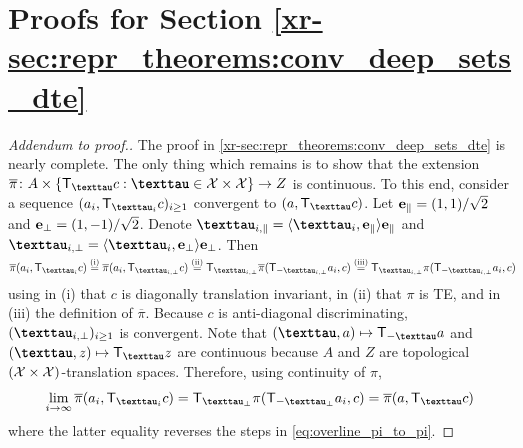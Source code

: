 \documentclass[12pt, twoside]{report}
\newcommand{\xrprefix}[1]{xr-#1}
\begin{document}
\section{Proofs for Section \ref{\xrprefix{sec:repr_theorems:conv_deep_sets_dte}}}
\label{sec:proofs_repr_theorems:conv_deep_sets_dte}

\begingroup
    \newcommand{\maybeprefix}[1]{\xrprefix{#1}}
\endgroup
\begin{proof}[Addendum to proof.]
    The proof in \cref{\xrprefix{sec:repr_theorems:conv_deep_sets_dte}} is nearly complete.
    The only thing which remains is to show that the extension
    $
        \overline{\pi} \colon A \times \set{\T_{\vtau} c : \vtau \in \X \times \X} \to Z
    $
    is continuous.
    To this end, consider a sequence $(a_i, \T_{\vtau_i} c)_{i \ge 1}$ convergent to $(a, \T_{\vtau} c)$.
    Let $\mathbf{e}_\parallel = (1, 1) / \sqrt{2}$ and $\mathbf{e}_\perp = (1, -1) / \sqrt{2}$.
    Denote $\vtau_{i,\parallel} = \lra{\vtau_i, \ve_{\parallel}} \ve_{\parallel}$
    and $\vtau_{i,\perp} = \lra{\vtau_i, \ve_{\perp}} \ve_{\perp}$.
    Then
    \begin{equation} \label{eq:overline_pi_to_pi}
        \overline{\pi}(a_i, \T_{\vtau_i} c)
        \overset{\smash{\text{(i)}}}{=} \overline{\pi}(a_i, \T_{\vtau_{i, \perp}} c)
        \overset{\smash{\text{(ii)}}}{=} \T_{\vtau_{i, \perp}} \overline{\pi}(\T_{-\vtau_{i,\perp}}a_i, c)
        \overset{\smash{\text{(iii)}}}{=} \T_{\vtau_{i, \perp}} \pi(\T_{-\vtau_{i,\perp}}a_i, c)
        \hspace{-5pt}
    \end{equation}
    using in (i) that $c$ is diagonally translation invariant, in (ii) that $\pi$ is TE, and in (iii) the definition of $\overline{\pi}$.
    Because $c$ is anti-diagonal discriminating, $(\vtau_{i,\perp})_{i \ge 1}$ is convergent.
    Note that $(\vtau, a) \mapsto \T_{-\vtau} a$
    and $(\vtau, z) \mapsto \T_{\vtau} z$ are continuous because $A$ and $Z$ are topological $(\mathcal{X}\times\mathcal{X})$-translation spaces.
    Therefore, using continuity of $\pi$,
    \begin{align}
        \lim_{i \to \infty} \overline{\pi}(a_i, \T_{\vtau_i} c)
        = \T_{\vtau_{\perp}} \pi(\T_{-\vtau_{\perp}}a_i, c)
        = \overline{\pi}(a, \T_{\vtau} c)
    \end{align}
    where the latter equality reverses the steps in \eqref{eq:overline_pi_to_pi}.
\end{proof}
\end{document}
